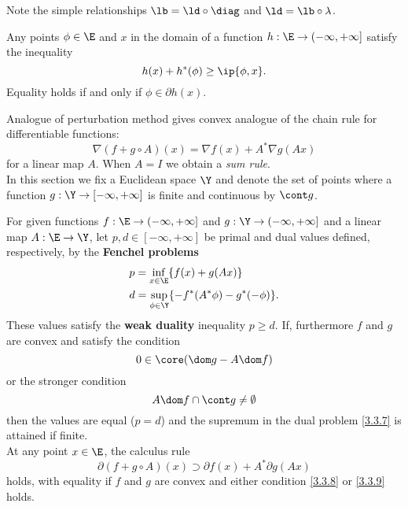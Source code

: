 \documentclass[../borwein-lewis_notes.tex]{subfiles}
\begin{document}
Note the simple relationships $\lb = \ld\circ\diag$ and $\ld = \lb\circ
\lambda$.
\begin{proposition}
Any points $\phi\in\E$ and $x$ in the domain of a function $h:\E\to
(-\infty,+\infty]$ satisfy the inequality
\begin{equation*}
h(x)+h^*(\phi)\geq \ip{\phi, x}.
\end{equation*}
Equality holds if and only if $\phi\in\partial h(x)$.
\label{3.3.4}
\end{proposition}
Analogue of perturbation method gives convex analogue of the chain rule 
for differentiable functions: 
\begin{equation*}
\nabla (f+g\circ A)(x) = \nabla f(x) + A^*\nabla g(Ax)
\end{equation*}
for a linear map $A$. When $A=I$ we obtain a \textit{sum rule}.\\
In this section we fix a Euclidean space $\Y$ and denote the set of 
points where a function $g:\Y\to[-\infty,+\infty]$ is finite and 
continuous by $\cont g$.
\begin{theorem}
For given functions $f:\E\to(-\infty,+\infty]$ and $g:\Y\to(-\infty,
+\infty]$ and a linear map $A:\E\to\Y$, let $p,d\in[-\infty,+\infty]$ 
be primal and dual values defined, respectively, by the 
\textbf{Fenchel problems}
\begin{align}
& p = \inf_{x\in\E}\{f(x) + g(Ax)\} \label{3.3.6}\\
& d = \sup_{\phi\in\Y}\{-f^*(A^*\phi)-g^*(-\phi)\}.
\label{3.3.7}
\end{align}
These values satisfy the \textbf{weak duality} inequality $p\geq d$. 
If, furthermore $f$ and $g$ are convex and satisfy the condition 
\begin{equation}
0\in\core(\dom g- A\dom f)
\label{3.3.8}
\end{equation}
or the stronger condition 
\begin{equation}
A\dom f\cap \cont g\neq \emptyset
\label{3.3.9}
\end{equation}
then the values are equal ($p=d$) and the supremum in the dual problem 
\eqref{3.3.7} is attained if finite. \\
At any point $x\in\E$, the calculus rule 
\begin{equation}
\partial (f+g\circ A)(x) \supset \partial f(x) + A^*\partial g(Ax)
\label{3.3.10}
\end{equation}
holds, with equality if $f$ and $g$ are convex and either condition 
\eqref{3.3.8} or \eqref{3.3.9} holds.
\label{3.3.5}
\end{theorem}
\end{document}
